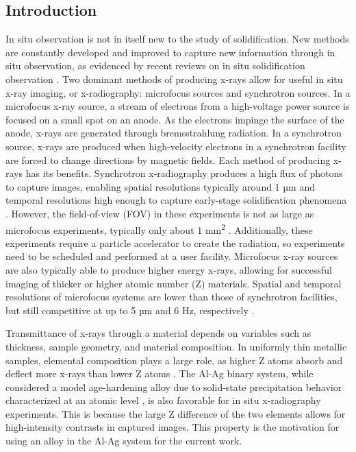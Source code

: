 \subsection{Introduction}
In situ observation is not in itself new to the study of solidification.
New methods are constantly developed and improved to capture new
information through in situ observation, as evidenced by recent reviews on
in situ solidification observation
\cite{Akamatsu2016,Shahani2020,Karagadde2021}.
Two dominant methods of producing
x-rays allow for useful in situ x-ray imaging, or x-radiography:
microfocus sources and synchrotron sources. In a microfocus x-ray source,
a stream of electrons from a high-voltage power source is focused on a
small spot on an anode. As the electrons impinge the surface of the anode,
x-rays are generated through bremsstrahlung radiation. In a synchrotron
source, x-rays are produced when high-velocity electrons in a synchrotron
facility are forced to change directions by magnetic fields. Each method
of producing x-rays has its benefits. Synchrotron x-radiography produces a
high flux of photons to capture images, enabling spatial resolutions
typically around 1 µm and temporal resolutions high enough to capture
early-stage solidification phenomena \cite{Mckeown2020}.
However, the field-of-view (FOV) in
these experiments is not as large as microfocus experiments, typically
only about 1 mm\textsuperscript{2} \cite{Mathiesen1999a}.
Additionally, these experiments require a particle
accelerator to create the radiation, so experiments need to be scheduled
and performed at a user facility. Microfocus x-ray sources are also
typically able to produce higher energy x-rays, allowing for successful
imaging of thicker or higher atomic number (Z) materials. Spatial and
temporal resolutions of microfocus systems are lower than those of
synchrotron facilities, but still competitive at up to 5 µm and 6 Hz,
respectively \cite{Rakete2011b}.

Transmittance of x-rays through a material depends on variables such as
thickness, sample geometry, and material composition. In uniformly thin
metallic samples, elemental composition plays a large role, as higher Z
atoms absorb and deflect more x-rays than lower Z atoms \cite{Heismann2003}.
The Al-Ag binary
system, while considered a model age-hardening alloy due to solid-state
precipitation behavior characterized at an atomic level \cite{Zhao2017},
is also
favorable for in situ x-radiography experiments. This is because the large
Z difference of the two elements allows for high-intensity contrasts in
captured images. This property is the motivation for using an alloy in the
Al-Ag system for the current work.

